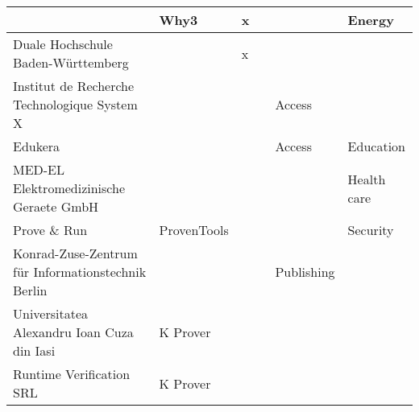 \begin{longtable}{|p{}|p{}|p{}|p{}|p{}|p{}|}
&
Why3
&
x
&
&
&
Energy
\\
\hline
Duale Hochschule Baden-Württemberg
&
&
x
&
&
&
\\
\hline
Institut de Recherche Technologique System X
&
&
&
&
Access
&
\\
\hline
Edukera
&
&
&
&
Access
&
Education
\\
\hline
MED-EL Elektromedizinische Geraete GmbH
&
&
&
&
&
Health care
\\
\hline
Prove \& Run
&
ProvenTools
&
&
&
&
Security
\\
\hline
Konrad-Zuse-Zentrum für Informationstechnik Berlin
&
&
&
&
Publishing
&
\\
\hline
Universitatea Alexandru Ioan Cuza din Iasi
&
K Prover
&
&
&
&
\\
\hline
Runtime Verification SRL
&
K Prover
&
&
&
&
\\
\hline
\end{longtable}

